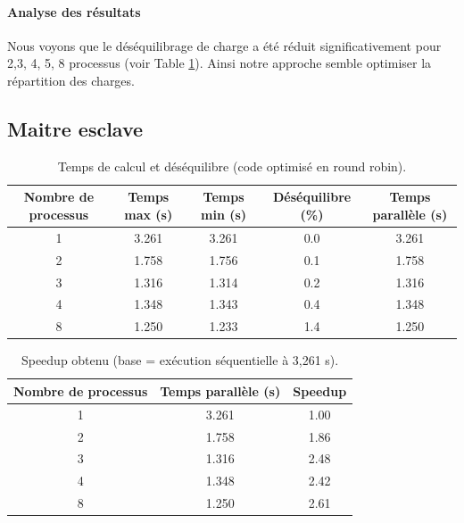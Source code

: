 \documentclass[a4paper,13pt]{book}
\begin{document}
\paragraph{Analyse des résultats}
Nous voyons que le déséquilibrage de charge a été réduit significativement pour 2,3, 4, 5, 8 processus (voir Table \ref{tab:temps_roundrobin}). Ainsi notre approche semble optimiser la répartition des charges.
\clearpage
\subsection{Maitre esclave}

\begin{table}[ht]
  \centering
  \caption{Temps de calcul et déséquilibre (code optimisé en round robin).}
  \label{tab:temps_roundrobin}
  \begin{tabular}{@{}ccccc@{}}
    \toprule
  \textbf{Nombre de processus} & \textbf{Temps max (s)} & \textbf{Temps min (s)} & \textbf{Déséquilibre (\%)} & \textbf{Temps parallèle (s)} \\
  \midrule
  1 & 3.261 & 3.261 & 0.0 & 3.261 \\
  2 & 1.758 & 1.756 & 0.1 & 1.758 \\
  3 & 1.316 & 1.314 & 0.2 & 1.316 \\
  4 & 1.348 & 1.343 & 0.4 & 1.348 \\
  8 & 1.250 & 1.233 & 1.4 & 1.250 \\
  \bottomrule
  \end{tabular}
  \end{table}
  
  \begin{table}[ht]
  \centering
  \caption{Speedup obtenu (base = exécution séquentielle à 3,261 s).}
  \label{tab:speedup_roundrobin}
  \begin{tabular}{@{}ccc@{}}
    \toprule
  \textbf{Nombre de processus} & \textbf{Temps parallèle (s)} & \textbf{Speedup} \\
  \midrule
  1 & 3.261 & 1.00 \\
  2 & 1.758 & 1.86 \\
  3 & 1.316 & 2.48 \\
  4 & 1.348 & 2.42 \\
  8 & 1.250 & 2.61 \\
  \bottomrule
  \end{tabular}
  \end{table}
  
\end{document}
